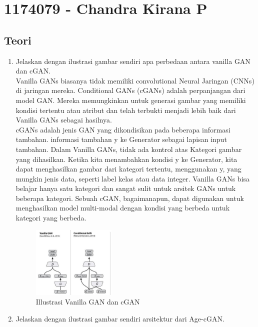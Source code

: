 \section{1174079 - Chandra Kirana P}

\subsection{Teori}
\begin{enumerate}
	\item Jelaskan dengan ilustrasi gambar sendiri apa perbedaan antara vanilla GAN dan cGAN.\\
	Vanilla GANs biasanya tidak memiliki convolutional Neural Jaringan (CNNs) di jaringan mereka.
Conditional GANs (cGANs) adalah perpanjangan dari model GAN. Mereka memungkinkan untuk generasi gambar yang memiliki kondisi tertentu atau atribut dan telah terbukti menjadi lebih baik dari Vanilla GANs sebagai hasilnya. \\
cGANs adalah jenis GAN yang dikondisikan pada beberapa informasi tambahan.  informasi tambahan y ke Generator sebagai lapisan input tambahan. Dalam Vanilla GANs, tidak ada kontrol atas Kategori gambar yang dihasilkan. Ketika kita menambahkan kondisi y ke Generator, kita dapat menghasilkan gambar dari kategori tertentu, menggunakan y, yang mungkin jenis data, seperti label kelas atau data integer. Vanilla GANs bisa belajar hanya satu kategori dan sangat sulit untuk arsitek GANs untuk beberapa kategori. Sebuah cGAN, bagaimanapun, dapat digunakan untuk menghasilkan model multi-modal dengan kondisi yang berbeda untuk kategori yang berbeda.

	\hfill \break
	\begin{figure}[H]
		\includegraphics[width=4cm]{figures/1174079/9/1.jpg}
		\centering
		\caption{Illustrasi Vanilla GAN dan cGAN}
	\end{figure}
	\item Jelaskan dengan ilustrasi gambar sendiri arsitektur dari Age-cGAN.
	\hfill \break
	

\end{enumerate}
